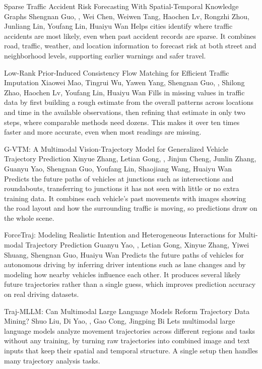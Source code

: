 {Sparse Traffic Accident Risk Forecasting With Spatial-Temporal Knowledge Graphs}
{Shengnan Guo, \me, Wei Chen, Weiwen Tang, Haochen Lv, Rongzhi Zhou, Junliang Lin, Youfang Lin, Huaiyu Wan}
{Helps cities identify where traffic accidents are most likely, even when past accident records are sparse. It combines road, traffic, weather, and location information to forecast risk at both street and neighborhood levels, supporting earlier warnings and safer travel.}

{Low-Rank Prior-Induced Consistency Flow Matching for Efficient Traffic Imputation}
{Xiaowei Mao, Tingrui Wu, Yawen Yang, Shengnan Guo, \me, Shilong Zhao, Haochen Lv, Youfang Lin, Huaiyu Wan}
{Fills in missing values in traffic data by first building a rough estimate from the overall patterns across locations and time in the available observations, then refining that estimate in only two steps, where comparable methods need dozens. This makes it over ten times faster and more accurate, even when most readings are missing.}

{G-VTM: A Multimodal Vision-Trajectory Model for Generalized Vehicle Trajectory Prediction}
{Xinyue Zhang, Letian Gong, \me, Jinjun Cheng, Junlin Zhang, Guanyu Yao, Shengnan Guo, Youfang Lin, Shaojiang Wang, Huaiyu Wan}
{Predicts the future paths of vehicles at junctions such as intersections and roundabouts, transferring to junctions it has not seen with little or no extra training data. It combines each vehicle's past movements with images showing the road layout and how the surrounding traffic is moving, so predictions draw on the whole scene.}

{ForceTraj: Modeling Realistic Intention and Heterogeneous Interactions for Multi-modal Trajectory Prediction}
{Guanyu Yao, \me, Letian Gong, Xinyue Zhang, Yiwei Shuang, Shengnan Guo, Huaiyu Wan}
{Predicts the future paths of vehicles for autonomous driving by inferring driver intentions such as lane changes and by modeling how nearby vehicles influence each other. It produces several likely future trajectories rather than a single guess, which improves prediction accuracy on real driving datasets.}

{Traj-MLLM: Can Multimodal Large Language Models Reform Trajectory Data Mining?}
{Shuo Liu, Di Yao, \me, Gao Cong, Jingping Bi}
{Lets multimodal large language models analyze movement trajectories across different regions and tasks without any training, by turning raw trajectories into combined image and text inputs that keep their spatial and temporal structure. A single setup then handles many trajectory analysis tasks.}

